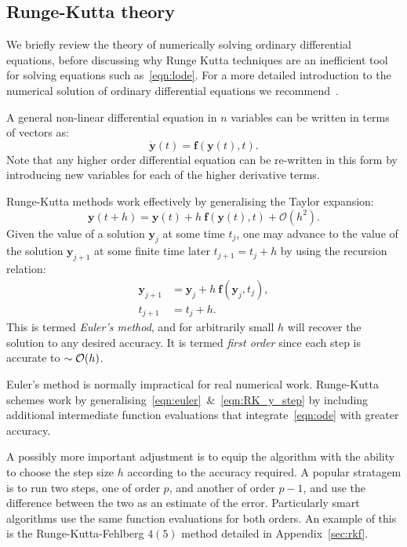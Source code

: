 \subsection{Runge-Kutta theory}
\label{sec:rk}
We briefly review the theory of numerically solving ordinary differential equations, before discussing why Runge Kutta techniques are an inefficient tool for solving equations such as~\eqref{eqn:lode}.
For a more detailed introduction to the numerical solution of ordinary differential equations we recommend~\cite{Press+2007}.

A general non-linear differential equation in \(n\) variables can be written in terms of vectors as:
\begin{equation}
  \dot{\mathbf{y}}(t) = \mathbf{f}(\mathbf{y}(t),t).
  \label{eqn:ode}
\end{equation}
Note that any higher order differential equation can be re-written in this form by introducing new variables for each of the higher derivative terms.

Runge-Kutta methods work effectively by generalising the Taylor expansion:
\begin{equation}
  \mathbf{y}(t+h)  = \mathbf{y}(t) + h\:\mathbf{f}(\mathbf{y}(t),t) + \mathcal{O}(h^2).
  \label{eqn:euler}
\end{equation}
Given the value of a solution \(\mathbf{y}_j\) at some time \(t_j\), one may advance to the value of the solution \(\mathbf{y}_{j+1}\) at some finite time later \(t_{j+1} = t_j + h\) by using the recursion relation:
\begin{align}
  \mathbf{y}_{j+1} &=  \mathbf{y}_{j} + h\:\mathbf{f}(\mathbf{y}_j,t_j),
  \label{eqn:RK_y_step}\\
  t_{j+1} &=  t_{j} + h.
  \label{eqn:RK_t_step}
\end{align}
This is termed {\em Euler's method}, and for arbitrarily small \(h\) will recover the solution to any desired accuracy. It is termed {\em first order\/} since each step is accurate to \({\sim\mathcal{O}{\left(h\right)}}\).

Euler's method is normally impractical for real numerical work. Runge-Kutta schemes work by generalising~\eqref{eqn:euler}~\&~\eqref{eqn:RK_y_step} by including additional intermediate function evaluations that integrate~\eqref{eqn:ode} with greater accuracy.

A possibly more important adjustment is to equip the algorithm with the ability to choose the step size \(h\) according to the accuracy required. A popular stratagem is to run two steps, one of order \(p\), and another of order \(p-1\), and use the difference between the two as an estimate of the error. Particularly smart algorithms use the same function evaluations for both orders. An example of this is the Runge-Kutta-Fehlberg \(4(5)\) method detailed in Appendix~\ref{sec:rkf}.

